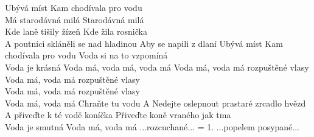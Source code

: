 \ve{}
Ubývá míst
Kam chodívala pro vodu\\
Má starodávná milá
Starodávná milá\\
Kde laně tišily žízeň
Kde žila rosnička\\
A poutníci skláněli se nad hladinou
Aby se napili z dlaní
\ve{}
Ubývá míst
Kam chodívala pro vodu
Voda si na to vzpomíná\\
Voda je krásná
Voda má, voda má, voda má
\cho{}
Voda má, voda má rozpuštěné vlasy\\
Voda má, voda má rozpuštěné vlasy\\
Voda má, voda má rozpuštěné vlasy\\
Voda má, voda má
Chraňte tu vodu
A Nedejte oslepnout prastaré zrcadlo hvězd
\ve{}
A přiveďte k té vodě koníčka
Přiveďte koně vraného jak tma\\
Voda je smutná
Voda má, voda má
\cho{}
...rozcuchané...
\ve{}
= 1.
\cho{}
...popelem posypané...
\cho{}
\esong{}